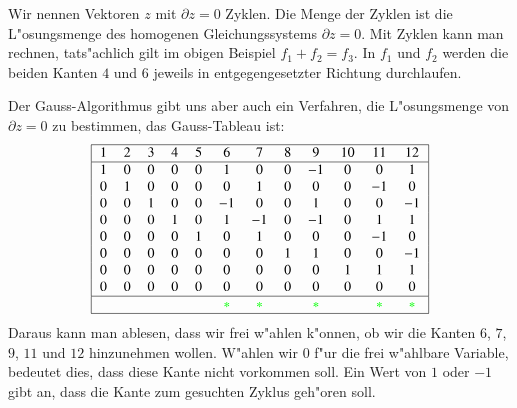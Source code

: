 Wir nennen Vektoren $z$ mit $\partial z=0$ Zyklen.
Die Menge der Zyklen ist die L"osungsmenge des homogenen
Gleichungssystems $\partial z=0$. Mit Zyklen kann man rechnen,
tats"achlich gilt im obigen Beispiel $f_1+f_2=f_3$. In $f_1$
und $f_2$ werden die beiden Kanten $4$ und $6$ jeweils in
entgegengesetzter Richtung durchlaufen.

Der Gauss-Algorithmus gibt uns aber auch ein Verfahren, die
L"osungsmenge von $\partial z=0$ zu bestimmen, das Gauss-Tableau
ist:
\[
\begin{tabular}{|>{$}c<{$}>{$}c<{$}>{$}c<{$}>{$}c<{$}>{$}c<{$}>{$}c<{$}>{$}c<{$}>{$}c<{$}>{$}c<{$}>{$}c<{$}>{$}c<{$}>{$}c<{$}|}
\hline
   1&  2&  3&  4&  5&  6&  7&  8&  9& 10& 11& 12\\
\hline
   1&  0&  0&  0&  0&  1&  0&  0& -1&  0&  0&  1\\
   0&  1&  0&  0&  0&  0&  1&  0&  0&  0& -1&  0\\
   0&  0&  1&  0&  0& -1&  0&  0&  1&  0&  0& -1\\
   0&  0&  0&  1&  0&  1& -1&  0& -1&  0&  1&  1\\
   0&  0&  0&  0&  1&  0&  1&  0&  0&  0& -1&  0\\
   0&  0&  0&  0&  0&  0&  0&  1&  1&  0&  0& -1\\
   0&  0&  0&  0&  0&  0&  0&  0&  0&  1&  1&  1\\
   0&  0&  0&  0&  0&  0&  0&  0&  0&  0&  0&  0\\
\hline
    &   &   &   &   &\color{green}  *&\color{green}  *&   &\color{green}  *&   &\color{green}  *&\color{green}  *\\
\hline
\end{tabular}
\]
Daraus kann man ablesen, dass wir frei w"ahlen
k"onnen, ob wir die Kanten $6$, $7$, $9$, $11$ und $12$
hinzunehmen wollen.
W"ahlen wir $0$ f"ur die frei w"ahlbare Variable, bedeutet dies,
dass diese Kante nicht vorkommen soll.
Ein Wert von $1$ oder $-1$ gibt an, dass die Kante zum gesuchten Zyklus
geh"oren soll.

